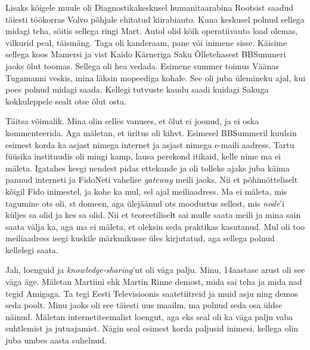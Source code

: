 Lisaks kõigele muule oli Diagnostikakeskusel humanitaarabina Rootsist saadud täiesti töökorras Volvo 
põhjale ehitatud kiirabiauto. Kuna keskusel polnud sellega 
midagi teha, sõitis sellega ringi Mart. Autol olid kõik 
operatiivauto load olemas, vilkurid peal, täismäng. Taga oli kanderaam, 
pane või inimene sisse. Käisime sellega koos
Mamersi ja vist Kaido Kärneriga Saku Õlletehasest BBSummeri jaoks õlut toomas. Sellega oli hea vedada. Esimene summer toimus Väänas Tugamanni veskis, mina läksin 
mopeediga kohale. See oli juba ülemineku ajal, 
kui poes polnud midagi saada. Kellegi tutvuste kaudu saadi kuidagi
Sakuga kokkuleppele sealt otse õlut osta. 


Täitsa võimalik. Mina olin selles vanuses, et õlut ei joonud, ja ei oska kommenteerida. Aga mäletan, et üritus oli kihvt.
Esimesel BBSummeril kuulsin esimest korda ka
asjast nimega internet ja asjast nimega e-maili aadress. Tartu füüsika 
instituudis oli mingi kamp, lausa 
perekond itikaid, kelle nime ma ei mäleta. Igatahes keegi 
nendest pidas ettekande ja oli tolleks ajaks juba käima pannud interneti ja 
FidoNeti vahelise \emph{gateway} meili jaoks. Nii et põhimõtteliselt kõigil 
Fido inimestel, ja kohe ka mul, sel ajal 
meiliaadress. Ma ei mäleta, mis tagumine ots oli, st domeen, aga 
ülejäänud ots moodustus sellest, mis \emph{node}'i küljes sa olid ja kes sa olid. Nii et teoreetiliselt sai mulle saata meili ja mina sain saata välja ka, 
aga ma ei mäleta, et oleksin seda praktikas kasutanud. Mul oli 
too meiliaadress isegi kuskile märkmikusse üles kirjutatud, aga sellega 
polnud kellelegi saata. 


Jah, loenguid ja \emph{knowledge-sharing}'ut oli väga palju. Minu, 
14aastase arust oli see väga äge. Mäletan Martiini ehk Martin Rinne demost, mida sai teha ja 
mida nad tegid Amigaga. Ta tegi Eesti Tele{\-}visioonis saatetiitreid ja muid asju ning demos seda poolt. Minu jaoks oli see täiesti uus maailm, ma polnud 
seda osa üldse näinud. Mäletan internetiteemalist loengut, aga 
eks seal oli ka väga palju vaba suhtlemist ja jutuajamist. Nägin seal
esimest korda paljusid inimesi, kellega olin juba umbes aasta suhelnud. 

